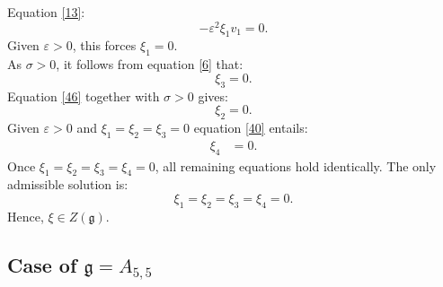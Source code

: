 \documentclass[10pt]{article}
\begin{document}
Equation \eqref{13}:
\begin{equation*}
-\varepsilon^2\xi_1v_1 = 0.
\end{equation*}
Given $\varepsilon > 0$, this forces $\xi_1 = 0$.\\
As $\sigma>0$, it follows from equation \eqref{6} that:
\begin{equation*}
\xi_3 = 0.
\end{equation*}
Equation \eqref{46} together with $\sigma>0$ gives:
\begin{equation*}
\xi_2 = 0.
\end{equation*}
Given $\varepsilon> 0$ and $\xi_1=\xi_2=\xi_3=0$ equation \eqref{40} entails:
\begin{align*}
\xi_4 &= 0.
\end{align*}
Once $\xi_1 = \xi_2 = \xi_3 = \xi_4 = 0$, all remaining equations hold identically.
The only  admissible solution is:
\begin{equation*}
\xi_1 = \xi_2 = \xi_3 = \xi_4 = 0.
\end{equation*}
Hence, $\xi\in Z(\mathfrak{g}).$
\subsection{Case of $\mathfrak{g}=A_{5,5}$}
\end{document}
